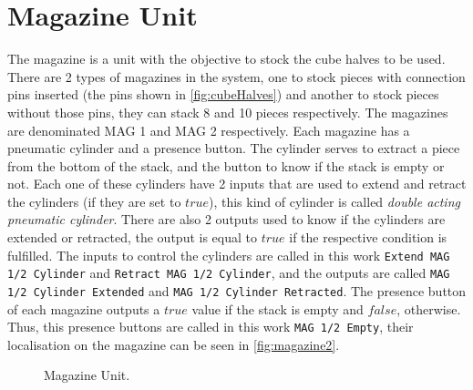 \section{Magazine Unit}
\label{sec:magazine}
The magazine is a unit with the objective to stock the cube halves to be used.
There are 2 types of magazines in the system, one to
 stock pieces with connection pins inserted (the pins shown in
 \autoref{fig:cubeHalves}) and another to stock pieces without those pins, they
 can stack 8 and 10 pieces
 respectively. The magazines are denominated MAG 1 and MAG 2 respectively.
Each magazine has a pneumatic cylinder and a presence button. The cylinder serves to extract a
piece from the bottom of the stack, and the button to know if the stack is empty
or not. Each one of these cylinders have 2 inputs that are used to extend and retract the cylinders (if they
are set to $true$), this kind of cylinder is called \emph{double acting
  pneumatic cylinder}. There are also 2
outputs  used to know if the cylinders are extended or retracted, the output
is equal to $true$ if the respective condition is fulfilled. The inputs to
control the cylinders are called in this work \verb|Extend MAG 1/2 Cylinder| and
\verb|Retract MAG 1/2 Cylinder|, and the outputs are called \verb|MAG 1/2 Cylinder Extended| and
\verb|MAG 1/2 Cylinder Retracted|. The presence button of each magazine outputs a $true$
value if the stack is empty and $false$, otherwise. Thus, this presence buttons
are called in this work \verb|MAG 1/2 Empty|, their localisation on the magazine
can be seen in \autoref{fig:magazine2}. 
\begin{figure}[H]
  \centering
  \caption{Magazine Unit.}
  \label{fig:magazine2}
\end{figure}

